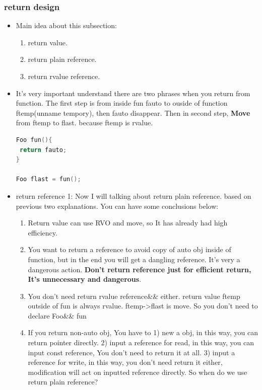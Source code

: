 \documentclass[a4paper,12pt,twoside]{book}
\begin{document}
\subsubsection{return design}
\begin{itemize}
\item Main idea about this subsection:
\begin{enumerate}
\item return value.
\item return plain reference.
\item return rvalue reference.
\end{enumerate}

\item It's very important understand there are two phrases when you return from function. The first step  is from inside fun fauto to ouside of function ftemp(unname tempory), then fauto disappear.  Then in second step, \textbf{Move} from ftemp to flast. because ftemp is rvalue.
\begin{lstlisting}[frame=single, language=c++]
Foo fun(){
 return fauto;
}

Foo flast = fun();
\end{lstlisting}


\item return reference 1: Now I will talking about return plain reference. based on previous two explanations. You can have some conclusions below:

\begin{enumerate}
\item Return value can use RVO and move, so It has already had high efficiency.

\item You want to return a reference to avoid copy of auto obj inside of function,  but in the end you will get a dangling reference. It's very a dangerous action. \textbf{Don't return reference just for efficient return, It's unnecessary and dangerous}.

\item You don't need return rvalue reference\&\& either.  return value ftemp outside of fun is always rvalue. ftemp->flast is move.  So you don't need to declare Foo\&\& fun


\item If you return non-auto obj, You have to 1) new a obj, in this way, you can return pointer directly. 2) input a reference for read, in this way, you can input const reference, You don't need to return it at all. 3) input a reference for write, in this way, you don't need return it either, modification will act on inputted reference directly. So when do we use return plain reference?
\end{enumerate}


\end{itemize}
\end{document}
